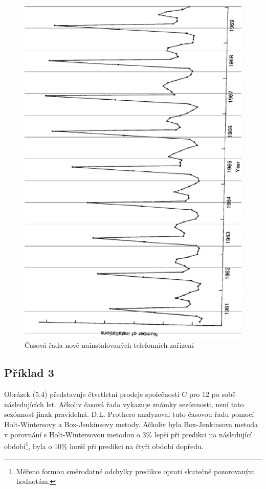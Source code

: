 \begin{figure}[htp]
\centering
\includegraphics[scale = 0.50]{pictures/figure_5_3.eps}
\caption{Časová řada nově nainstalovaných telefonních zařízení}
\label{figure_5_3}
\end{figure}

\subsection{Příklad 3}

Obrázek (5.4) představuje čtvrtletní prodeje společnosti C pro 12 po sobě následujících let. Ačkoliv časová řada vykazuje známky sezónnosti, není tato sezónnost jinak pravidelná. D.L. Prothero analyzoval tuto časovou řadu pomocí Holt-Wintersovy a Box-Jenkinsovy metody. Ačkoliv byla Box-Jenkinsova metoda v porovnání s Holt-Wintersovou metodou o 3\% lepší při predikci na následující období\footnote{Měřeno formou směrodatné odchylky predikce oproti skutečně pozorovaným hodnotám.}, byla o 10\% horší při predikci na čtyři období dopředu.

